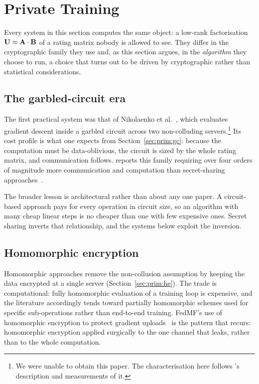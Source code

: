 \section{Private Training}
\label{sec:training}

Every system in this section computes the same object: a low-rank factorisation
$\mathbf{U} \approx \mathbf{A} \cdot \mathbf{B}$ of a rating matrix nobody is allowed to see. They
differ in the cryptographic family they use and, as this section argues, in the \emph{algorithm}
they choose to run, a choice that turns out to be driven by cryptographic rather than
statistical considerations.

\subsection{The garbled-circuit era}
\label{sec:training:gc}

The first practical system was that of Nikolaenko et al.~\cite{nikolaenko2013}, which evaluates
gradient descent inside a garbled circuit across two non-colluding
servers.\footnote{We were unable to obtain this paper. The characterisation here follows
\nudge{}'s description and measurements of it.} Its cost profile is what one expects from
Section~\ref{sec:prim:gc}: because the computation must be data-oblivious, the circuit is sized by
the whole rating matrix, and communication follows. \nudgeplain{} reports this family requiring
over four orders of magnitude more communication and computation than secret-sharing
approaches~\cite{nudge2026}.

The broader lesson is architectural rather than about any one paper. A circuit-based approach pays
for every operation in circuit size, so an algorithm with many cheap linear steps is no cheaper
than one with few expensive ones. Secret sharing inverts that relationship, and the systems below
exploit the inversion.

\subsection{Homomorphic encryption}
\label{sec:training:he}

Homomorphic approaches remove the non-collusion assumption by keeping the data encrypted at a
single server (Section~\ref{sec:prim:he}). The trade is computational: fully homomorphic
evaluation of a training loop is expensive, and the literature accordingly tends toward partially
homomorphic schemes used for specific sub-operations rather than end-to-end training. FedMF's use
of homomorphic encryption to protect gradient uploads~\cite{chai2021} is the pattern that recurs:
homomorphic encryption applied surgically to the one channel that leaks, rather than to the whole
computation.

